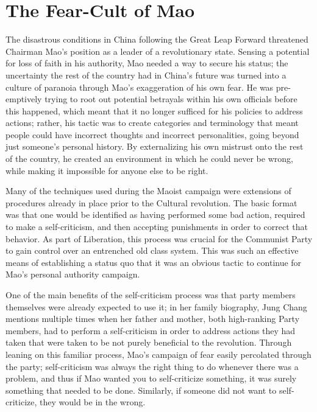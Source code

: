 \section{The Fear-Cult of Mao}


The disastrous conditions in China following the Great Leap Forward threatened
Chairman Mao's position as a leader of a revolutionary state. Sensing a
potential for loss of faith in his authority, Mao needed a way to secure his
status; the uncertainty the rest of the country had in China's future was turned
into a culture of paranoia through Mao's exaggeration of his own fear. He was
pre-emptively trying to root out potential betrayals within his own officials
before this happened, which meant that it no longer sufficed for his policies to
address actions; rather, his tactic was to create categories and terminology
that meant people could have incorrect thoughts and incorrect personalities,
going beyond just someone's personal history. By externalizing his own mistrust
onto the rest of the country, he created an environment in which he could never
be wrong, while making it impossible for anyone else to be right.

Many of the techniques used during the Maoist campaign were extensions of
procedures already in place prior to the Cultural revolution. The basic
format was that one would be identified as having performed some bad action,
required to make a self-criticism, and then accepting punishments in order
to correct that behavior. As part of Liberation, this process was crucial
for the Communist Party to gain control over an entrenched old class system.
This was such an effective means of establishing a status quo that it was an
obvious tactic to continue for Mao's personal authority campaign.

One of the main benefits of the self-criticism process was that party
members themselves were already expected to use it; in her family
biography, Jung Chang mentions multiple times when her father and
mother, both high-ranking Party members, had to perform a self-criticism
in order to address actions they had taken that were taken to be not
purely beneficial to the revolution. Through leaning on this familiar
process, Mao's campaign of fear easily percolated through the party;
self-criticism was always the right thing to do whenever there was a
problem, and thus if Mao wanted you to self-criticize something, it was
surely something that needed to be done.  Similarly, if someone did not
want to self-criticize, they would be in the wrong.

